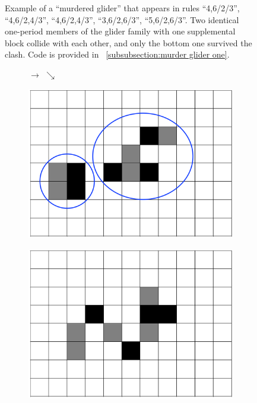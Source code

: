 \documentclass[12pt]{article}
\numberwithin{figure}{section} %
\begin{document}
\begin{figure}[H]
\begin{subfigure}{0.22\textwidth}
     	\subcaption{}
   	\end{subfigure}
   \caption[Example of a "murdered glider"]{Example of a “murdered glider” that appears in rules “4,6/2/3”, “4,6/2,4/3”, “4,6/2,4/3”, “3,6/2,6/3”, “5,6/2,6/3”. Two identical one-period members of the glider family with one supplemental block collide with each other, and only the bottom one survived the clash. Code is provided in ~\ref{subsubsection:murder glider one}. }
   \label{fig:murder glider one}
   \vspace{-1.5em}
\end{figure}

\begin{figure}[H]
	\begin{subfigure}[t]{0.06\textwidth}
		\centering
		{\LARGE$\xrightarrow{}$}
		{\LARGE$\searrow{}$}
  	\end{subfigure}	
	\begin{subfigure}{0.22\textwidth}
     		\centering
     		\includegraphics[width=\linewidth]{Section4/33.0}
     		\subcaption{}
   	\end{subfigure}
    	\begin{subfigure}{0.22\textwidth}
     		\centering
     		\includegraphics[width=\linewidth]{Section4/33.1}

\end{subfigure}
\end{figure}
\end{document}

